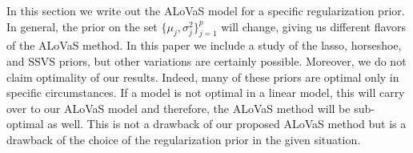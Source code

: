 In this section we write out the ALoVaS model for a specific regularization prior. In general, the prior on the set $\{\mu_j,\sigma^2_j\}_{j=1}^{p}$ will change, giving us different flavors of the ALoVaS method. In this paper we include a study of the lasso, horseshoe, and SSVS priors, but other variations are certainly possible. Moreover, we do not claim optimality of our results. Indeed, many of these priors are optimal only in specific circumstances. If a model is not optimal in a linear model, this will carry over to our ALoVaS model and therefore, the ALoVaS method will be sub-optimal as well. This is not a drawback of our proposed ALoVaS method but is a drawback of the choice of the regularization prior in the given situation.  
